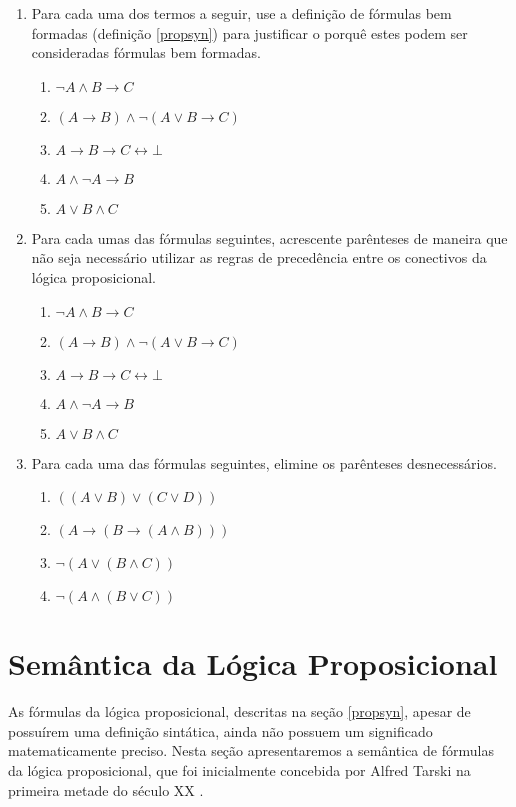 \begin{enumerate}
  \item Para cada uma dos termos a seguir, use a defini\c{c}\~ao
    de f\'ormulas bem formadas (defini\c{c}\~ao \ref{propsyn}) para
    justificar o porqu\^e estes podem ser consideradas f\'ormulas bem
    formadas.
   \begin{enumerate}
       \item $\neg A \land B \to C$
       \item $(A \to B) \land \neg (A \lor B \to C)$
       \item $A \to B \to C \leftrightarrow \bot$
       \item $A \land \neg A \to B$
       \item $A \lor B \land C$
   \end{enumerate}
   \item Para cada umas das f\'ormulas seguintes, acrescente
     par\^enteses de maneira que n\~ao seja necess\'ario utilizar as
     regras de preced\^encia entre os conectivos da l\'ogica proposicional. 
   \begin{enumerate}
       \item $\neg A \land B \to C$
       \item $(A \to B) \land \neg (A \lor B \to C)$
       \item $A \to B \to C \leftrightarrow \bot$
       \item $A \land \neg A \to B$
       \item $A \lor B \land C$
   \end{enumerate}
   \item Para cada uma das f\'ormulas seguintes, elimine os par\^enteses
   desnecess\'arios.
  \begin{enumerate}			
	\item $((A\lor B)\lor (C\lor D))$
	\item $(A\rightarrow (B\rightarrow (A\land B)))$
	\item $\neg(A \lor (B\land C))$
	\item $\neg(A \land (B\lor C))$			
  \end{enumerate}
\end{enumerate}

\section{Sem\^antica da L\'ogica Proposicional}\label{propsem}

As f\'ormulas da l\'ogica proposicional, descritas na se\c{c}\~ao
\ref{propsyn}, apesar de possu\'irem uma defini\c{c}\~ao sint\'atica, 
ainda n\~ao possuem um significado matematicamente preciso. Nesta
se\c{c}\~ao apresentaremos a sem\^antica de f\'ormulas da l\'ogica
proposicional, que foi inicialmente concebida por Alfred Tarski na
primeira metade do s\'eculo XX \cite{halmos57}.

